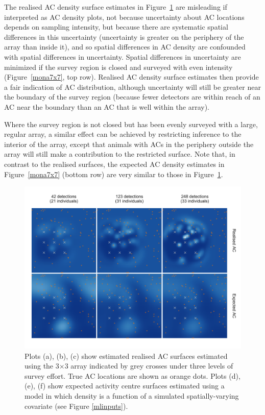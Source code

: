 \documentclass[useAMS,usenatbib,referee]{biom}
\begin{document}
The realised AC density surface estimates in Figure~\ref{mona3x3} are misleading if interpreted as AC density plots, not because uncertainty about AC locations depends on sampling intensity, but because there are systematic spatial differences in this uncertainty (uncertainty is greater on the periphery of the array than inside it), and so spatial differences in AC density are confounded with spatial differences in uncertainty. Spatial differences in uncertainty are minimized if the survey region is closed and surveyed with even intensity (Figure~\ref{mona7x7}, top row). Realised AC density surface estimates then provide a fair indication of AC distribution, although uncertainty will still be greater near the boundary of the survey region (because fewer detectors are within reach of an AC near the boundary than an AC that is well within the array). 

Where the survey region is not closed but has been evenly surveyed with a large, regular array, a similar effect can be achieved by restricting inference to the interior of the array, except that animals with ACs in the periphery outside the array will still make a contribution to the restricted surface. Note that, in contrast to the realised surfaces, the expected AC density estimates in Figure~\ref{mona7x7} (bottom row) are very similar to those in Figure~\ref{mona3x3}. 

\begin{figure}[htbp]
\centering
\includegraphics[width=1\textwidth]{mona_3x3.png}
\caption{Plots (a), (b), (c) show estimated realised AC surfaces estimated using the 3$\times$3 array indicated by grey crosses under three levels of survey effort. True AC locations are shown as orange dots. Plots (d), (e), (f) show expected activity centre surfaces estimated using a model in which density is a function of a simulated spatially-varying covariate (see Figure \ref{mlinputs}).}
\label{mona3x3}
\end{figure}
\end{document}
